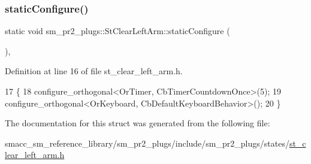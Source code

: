 \subsubsection{\texorpdfstring{static\+Configure()}{staticConfigure()}}
{\footnotesize\ttfamily static void sm\+\_\+pr2\+\_\+plugs\+::\+St\+Clear\+Left\+Arm\+::static\+Configure (\begin{DoxyParamCaption}{ }\end{DoxyParamCaption})\hspace{0.3cm}{\ttfamily [inline]}, {\ttfamily [static]}}



Definition at line 16 of file st\+\_\+clear\+\_\+left\+\_\+arm.\+h.


\begin{DoxyCode}
17     \{
18         configure\_orthogonal<OrTimer,  CbTimerCountdownOnce>(5);    
19         configure\_orthogonal<OrKeyboard, CbDefaultKeyboardBehavior>();
20     \}
\end{DoxyCode}


The documentation for this struct was generated from the following file\+:\begin{DoxyCompactItemize}
\item 
smacc\+\_\+sm\+\_\+reference\+\_\+library/sm\+\_\+pr2\+\_\+plugs/include/sm\+\_\+pr2\+\_\+plugs/states/\hyperlink{st__clear__left__arm_8h}{st\+\_\+clear\+\_\+left\+\_\+arm.\+h}\end{DoxyCompactItemize}
